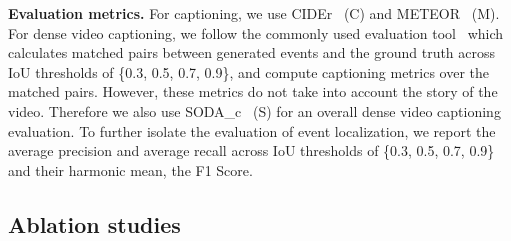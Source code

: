 \begin{table}[t]
\centering
\vspace{-0pt}
\begin{center}
\setlength\tabcolsep{6pt}
\vspace{-0.3cm}
\caption{\small \textbf{Ablation showing the impact of using untrimmed videos and adding time tokens during pretraining.} When we use untrimmed video-speech inputs, time information from transcribed speech sentence boundaries is integrated via time tokens.}
\vspace{-0.9cm}
\label{table:pretraining}
\end{center}
\end{table}

\noindent \textbf{Evaluation metrics.} 
For captioning, we use
CIDEr~\cite{vedantam2015cider} (C) and METEOR~\cite{banerjee2005meteor} (M).
For dense video captioning, we follow the commonly used evaluation tool~\cite{krishna2017dense} which calculates matched pairs between generated events and the ground truth across IoU thresholds of \{0.3, 0.5, 0.7, 0.9\}, and compute captioning metrics over the matched pairs.
However, these metrics do not take into account the story of the video.
Therefore we also use SODA\_c~\cite{fujita2020soda} (S) for an overall dense video captioning evaluation.
To further isolate the evaluation of event localization, we report the average precision and average recall across IoU thresholds of \{0.3, 0.5, 0.7, 0.9\} and their harmonic mean, the F1 Score.

\subsection{Ablation studies}\label{sec:ablation}
\vspace{-0.1cm}

